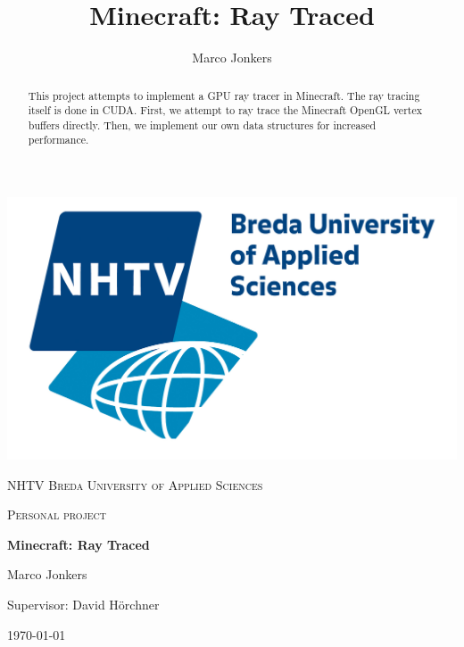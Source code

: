 \documentclass[]{article}
\title{Minecraft: Ray Traced}
\author{Marco Jonkers}
\begin{document}

\begin{titlepage}
  \centering
  \includegraphics[scale=0.5]{eng_logofc_uas.jpg}\par\vspace{1cm}
  {\scshape\LARGE NHTV Breda University of Applied Sciences\par}
  \vspace{1cm}
  {\scshape\Large Personal project\par}
  \vspace{1.5cm}
  {\huge\bfseries Minecraft: Ray Traced\par}
  \vspace{2cm}
  {\Large Marco Jonkers\par}
  \vspace{0.5cm}
  {Supervisor: David H{\"o}rchner\par}

  
  \vspace{2cm}
  
  \begin{abstract}
    This project attempts to implement a GPU ray tracer in Minecraft.
    The ray tracing itself is done in CUDA.
    First, we attempt to ray trace the Minecraft OpenGL vertex buffers directly.
    Then, we implement our own data structures for increased performance.
  \end{abstract}
  
  \vfill
  
  {\large \today\par}
\end{titlepage}
\end{document}
